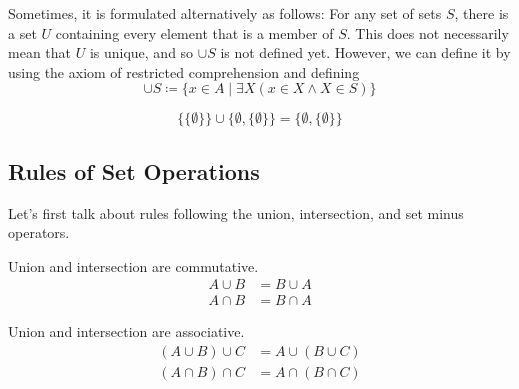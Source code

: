   Sometimes, it is formulated alternatively as follows: For any set of sets $S$, there is a set $U$ containing every element that is a member of $S$. This does not necessarily mean that $U$ is unique, and so $\cup S$ is not defined yet. However, we can define it by using the axiom of restricted comprehension and defining 
  \begin{equation}
    \cup S \coloneqq \{ x \in A \mid \exists X (x \in X \land X \in S ) \}
  \end{equation}

  \begin{example}
    \begin{equation}
      \{\{\emptyset\}\} \cup \{\emptyset, \{\emptyset\}\} = \{\emptyset, \{\emptyset\}\}
    \end{equation}
  \end{example}

\subsection{Rules of Set Operations}

  Let's first talk about rules following the union, intersection, and set minus operators. 

  \begin{theorem}[Commutativity]
    Union and intersection are commutative. 
    \begin{align}
      A \cup B & = B \cup A \\
      A \cap B & = B \cap A
    \end{align}
  \end{theorem}

  \begin{theorem}[Associativity]
    Union and intersection are associative. 
    \begin{align}
      (A \cup B) \cup C & = A \cup (B \cup C) \\
      (A \cap B) \cap C & = A \cap (B \cap C) 
    \end{align}
  \end{theorem}

